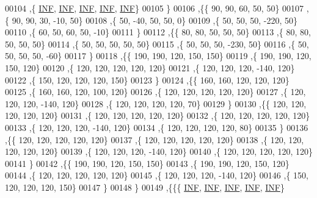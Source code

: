 \begin{DoxyCode}
00104   ,\{   \mbox{\hyperlink{1_88_84__epars_8h_a12c2040f25d8e3a7b9e1c2024c618cb6}{INF}},   \mbox{\hyperlink{1_88_84__epars_8h_a12c2040f25d8e3a7b9e1c2024c618cb6}{INF}},   \mbox{\hyperlink{1_88_84__epars_8h_a12c2040f25d8e3a7b9e1c2024c618cb6}{INF}},   \mbox{\hyperlink{1_88_84__epars_8h_a12c2040f25d8e3a7b9e1c2024c618cb6}{INF}},   \mbox{\hyperlink{1_88_84__epars_8h_a12c2040f25d8e3a7b9e1c2024c618cb6}{INF}}\}
00105   \}
00106  ,\{\{    90,    90,    60,    50,    50\}
00107   ,\{    90,    90,    30,   -10,    50\}
00108   ,\{    50,   -40,    50,    50,     0\}
00109   ,\{    50,    50,    50,  -220,    50\}
00110   ,\{    60,    50,    60,    50,   -10\}
00111   \}
00112  ,\{\{    80,    80,    50,    50,    50\}
00113   ,\{    80,    80,    50,    50,    50\}
00114   ,\{    50,    50,    50,    50,    50\}
00115   ,\{    50,    50,    50,  -230,    50\}
00116   ,\{    50,    50,    50,    50,   -60\}
00117   \}
00118  ,\{\{   190,   190,   120,   150,   150\}
00119   ,\{   190,   190,   120,   150,   120\}
00120   ,\{   120,   120,   120,   120,   120\}
00121   ,\{   120,   120,   120,  -140,   120\}
00122   ,\{   150,   120,   120,   120,   150\}
00123   \}
00124  ,\{\{   160,   160,   120,   120,   120\}
00125   ,\{   160,   160,   120,   100,   120\}
00126   ,\{   120,   120,   120,   120,   120\}
00127   ,\{   120,   120,   120,  -140,   120\}
00128   ,\{   120,   120,   120,   120,    70\}
00129   \}
00130  ,\{\{   120,   120,   120,   120,   120\}
00131   ,\{   120,   120,   120,   120,   120\}
00132   ,\{   120,   120,   120,   120,   120\}
00133   ,\{   120,   120,   120,  -140,   120\}
00134   ,\{   120,   120,   120,   120,    80\}
00135   \}
00136  ,\{\{   120,   120,   120,   120,   120\}
00137   ,\{   120,   120,   120,   120,   120\}
00138   ,\{   120,   120,   120,   120,   120\}
00139   ,\{   120,   120,   120,  -140,   120\}
00140   ,\{   120,   120,   120,   120,   120\}
00141   \}
00142  ,\{\{   190,   190,   120,   150,   150\}
00143   ,\{   190,   190,   120,   150,   120\}
00144   ,\{   120,   120,   120,   120,   120\}
00145   ,\{   120,   120,   120,  -140,   120\}
00146   ,\{   150,   120,   120,   120,   150\}
00147   \}
00148  \}
00149 ,\{\{\{   \mbox{\hyperlink{1_88_84__epars_8h_a12c2040f25d8e3a7b9e1c2024c618cb6}{INF}},   \mbox{\hyperlink{1_88_84__epars_8h_a12c2040f25d8e3a7b9e1c2024c618cb6}{INF}},   \mbox{\hyperlink{1_88_84__epars_8h_a12c2040f25d8e3a7b9e1c2024c618cb6}{INF}},   \mbox{\hyperlink{1_88_84__epars_8h_a12c2040f25d8e3a7b9e1c2024c618cb6}{INF}},   \mbox{\hyperlink{1_88_84__epars_8h_a12c2040f25d8e3a7b9e1c2024c618cb6}{INF}}\}

\end{DoxyCode}
